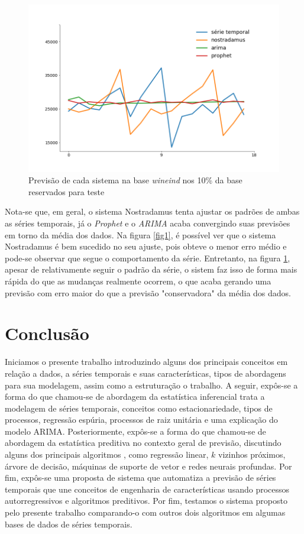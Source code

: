 \documentclass[twocolumn]{rbef}
\newcommand{\1}{\mathbbm{1}}
\begin{document}
\begin{figure}[!htb]
	\centering \includegraphics[scale=0.3]{fig2.png}
	\caption{Previsão de cada sistema na base \textit{wineind} nos 10\% da base reservados para teste}
	\label{fig2}
\end{figure}

Nota-se que, em geral, o sistema Nostradamus tenta ajustar os padrões de ambas as séries temporais, já o \textit{Prophet} e o \textit{ARIMA} acaba convergindo suas previsões em torno da média dos dados. Na figura \ref{fig1}, é possível ver que o sistema Nostradamus é bem sucedido no seu ajuste, pois obteve o menor erro médio e pode-se observar que segue o comportamento da série. Entretanto, na figura \ref{fig2}, apesar de relativamente seguir o padrão da série, o sistem faz isso de forma mais rápida do que as mudanças realmente ocorrem, o que acaba gerando uma previsão com erro maior do que a previsão "conservadora" da média dos dados.

\section{Conclusão}

Iniciamos o presente trabalho introduzindo alguns dos principais conceitos em relação a dados, a séries temporais e suas características, tipos de abordagens para sua modelagem, assim como a estruturação o trabalho. A seguir, expôs-se a forma do que chamou-se de abordagem da estatística inferencial trata a modelagem de séries temporais, conceitos como estacionariedade, tipos de processos, regressão espúria, processos de raiz unitária e uma explicação do modelo ARIMA. Posteriormente, expôs-se a forma do que chamou-se de abordagem da estatística preditiva no contexto geral de previsão, discutindo alguns dos principais algoritmos , como regressão linear, $k$ vizinhos próximos, árvore de decisão, máquinas de suporte de vetor e redes neurais profundas. Por fim, expôs-se uma proposta de sistema que automatiza a previsão de séries temporais que une conceitos de engenharia de características usando processos autorregressivos e algoritmos preditivos. Por fim, testamos o sistema proposto pelo presente trabalho comparando-o com outros dois algoritmos em algumas bases de dados de séries temporais.
\end{document}
